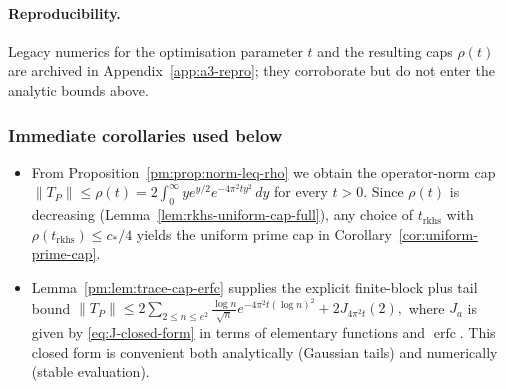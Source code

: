 \paragraph{Reproducibility.}
Legacy numerics for the optimisation parameter $t$ and the resulting caps $\rho(t)$ are archived in
Appendix~\ref{app:a3-repro}; they corroborate but do not enter the analytic bounds above.

\subsubsection{Immediate corollaries used below}
\begin{itemize}
  \item From Proposition~\ref{pm:prop:norm-leq-rho} we obtain the operator-norm cap
  \(
    \|T_P\|\le \rho(t)=2\int_{0}^{\infty} y e^{y/2} e^{-4\pi^2 t y^2}\,dy
  \)
  for every $t>0$. Since $\rho(t)$ is decreasing (Lemma~\ref{lem:rkhs-uniform-cap-full}), any choice of $t_{\mathrm{rkhs}}$
  with $\rho(t_{\mathrm{rkhs}})\le c_*/4$ yields the uniform prime cap in Corollary~\ref{cor:uniform-prime-cap}.
  \item Lemma~\ref{pm:lem:trace-cap-erfc} supplies the explicit finite-block plus tail bound
  \(
    \|T_P\| \le 2\sum_{2\le n\le e^{2}} \frac{\log n}{\sqrt n} e^{-4\pi^2 t(\log n)^2} + 2 J_{4\pi^2 t}(2),
  \)
  where $J_a$ is given by \eqref{eq:J-closed-form} in terms of elementary functions and $\operatorname{erfc}$. This closed form is convenient both analytically (Gaussian tails) and numerically (stable evaluation).
\end{itemize}
